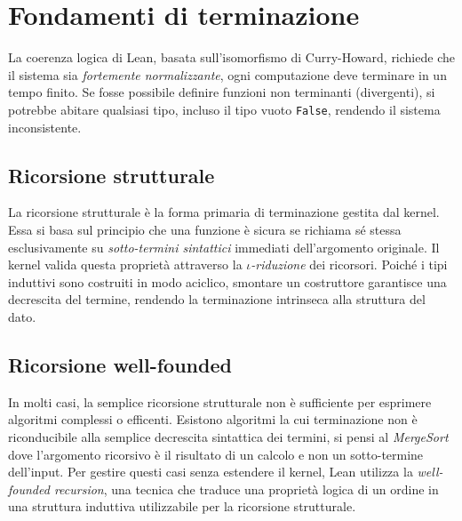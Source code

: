\section{Fondamenti di terminazione}
La coerenza logica di Lean, basata sull'isomorfismo di Curry-Howard, richiede che il sistema sia \emph{fortemente normalizzante}, ogni computazione 
deve terminare in un tempo finito. Se fosse possibile definire funzioni non terminanti (divergenti), si potrebbe abitare qualsiasi tipo, incluso il 
tipo vuoto \texttt{False}, rendendo il sistema inconsistente.

\subsection{Ricorsione strutturale}
La ricorsione strutturale è la forma primaria di terminazione gestita dal kernel. Essa si basa sul principio che una funzione è sicura se richiama 
sé stessa esclusivamente su \emph{sotto-termini sintattici} immediati dell'argomento originale. Il kernel valida questa proprietà attraverso la 
\textit{$\iota$-riduzione} dei ricorsori. Poiché i tipi induttivi sono costruiti in modo aciclico, smontare un costruttore garantisce una decrescita 
del termine, rendendo la terminazione intrinseca alla struttura del dato.

\subsection{Ricorsione well-founded}
In molti casi, la semplice ricorsione strutturale non è sufficiente per esprimere algoritmi complessi o efficenti. Esistono algoritmi la cui terminazione non 
è riconducibile alla semplice decrescita sintattica dei termini, si pensi al \textit{MergeSort} dove l'argomento ricorsivo è il risultato di un calcolo e non 
un sotto-termine dell'input. Per gestire questi casi senza estendere il kernel, Lean utilizza la \textit{well-founded recursion}, una tecnica che traduce una 
proprietà logica di un ordine in una struttura induttiva utilizzabile per la ricorsione strutturale.

